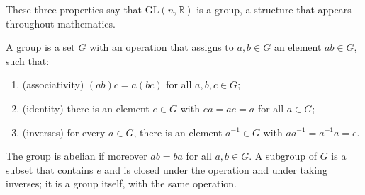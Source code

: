These three properties say that $\mathrm{GL}(n, \mathbb{R})$ is a group, a structure that appears throughout mathematics.

\begin{definition}[Group]\label{L1-def:group}
    A group is a set $G$ with an operation that assigns to $a, b \in G$ an element $ab \in G$, such that:
    \begin{enumerate}
        \item (associativity) $(ab)c = a(bc)$ for all $a, b, c \in G$;
        \item (identity) there is an element $e \in G$ with $ea = ae = a$ for all $a \in G$;
        \item (inverses) for every $a \in G$, there is an element $a^{-1} \in G$ with $aa^{-1} = a^{-1}a = e$.
    \end{enumerate}
    The group is abelian if moreover $ab = ba$ for all $a, b \in G$. A subgroup of $G$ is a subset that contains $e$ and is closed under the operation and under taking inverses; it is a group itself, with the same operation.
\end{definition}

